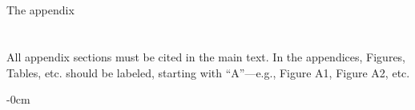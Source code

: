 \documentclass[coasts,article,submit,pdftex,moreauthors]{Definitions/mdpi}
\begin{document}
\subsection[\appendixname~\thesubsection]{}
The appendix 

\section[\appendixname~\thesection]{}
All appendix sections must be cited in the main text. In the appendices, Figures, Tables, etc. should be labeled, starting with ``A''---e.g., Figure A1, Figure A2, etc.

\begin{adjustwidth}{-\extralength}{0cm}

\nocite{*}



\end{adjustwidth}
\end{document}
